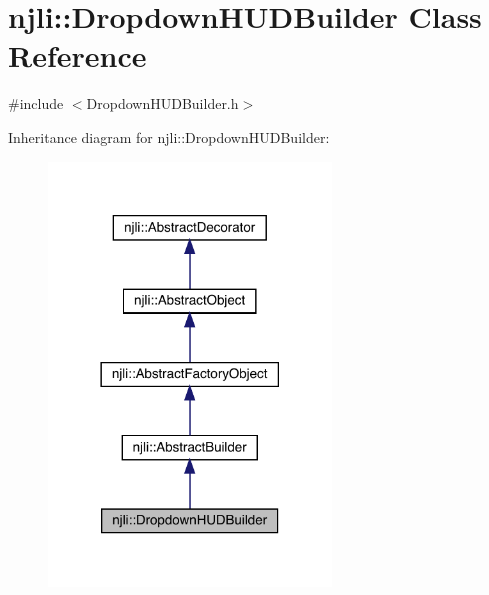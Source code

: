 \hypertarget{classnjli_1_1_dropdown_h_u_d_builder}{}\section{njli\+:\+:Dropdown\+H\+U\+D\+Builder Class Reference}
\label{classnjli_1_1_dropdown_h_u_d_builder}


{\ttfamily \#include $<$Dropdown\+H\+U\+D\+Builder.\+h$>$}



Inheritance diagram for njli\+:\+:Dropdown\+H\+U\+D\+Builder\+:\nopagebreak
\begin{figure}[H]
\begin{center}
\leavevmode
\includegraphics[width=213pt]{classnjli_1_1_dropdown_h_u_d_builder__inherit__graph}
\end{center}
\end{figure}


